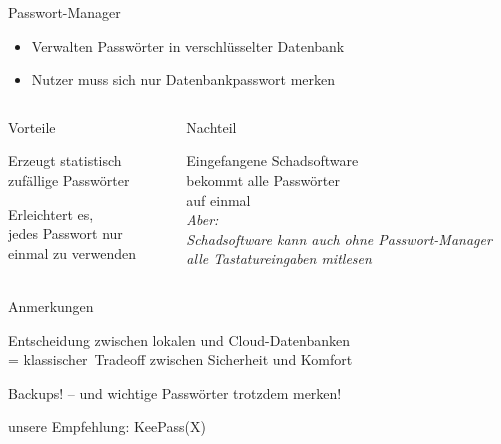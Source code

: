 \begin{frame}{Passwort-Manager}
  \begin{itemize}
    \item Verwalten Passwörter in verschlüsselter Datenbank
    \item Nutzer muss sich nur Datenbankpasswort merken
  \end{itemize}

  \begin{columns}[T]
    \begin{column}{.45\textwidth}
      \pause
      \begin{blit}{Vorteile}
        \small
        \item Erzeugt statistisch zufällige Passwörter
        \item Erleichtert es,\\jedes Passwort nur\\einmal zu verwenden
      \end{blit}
    \end{column}
    \begin{column}{.55\textwidth}
      \pause
      \begin{blit}{Nachteil}
        \small
        \item Eingefangene Schadsoftware\\bekommt alle Passwörter\\auf einmal\\
          \emph{Aber:\\ Schadsoftware kann auch ohne Passwort-Manager alle Tastatureingaben mitlesen}
      \end{blit}
    \end{column}
  \end{columns}
  \pause
  \begin{blit}{Anmerkungen}
    \small
    \item Entscheidung zwischen lokalen und \glqq Cloud\grqq -Datenbanken\\ = \glqq klassischer\grqq\ Tradeoff zwischen Sicherheit und Komfort
    \item Backups! -- und wichtige Passwörter trotzdem merken!
    \item unsere Empfehlung: KeePass(X)
  \end{blit}
\end{frame}

\endinput

